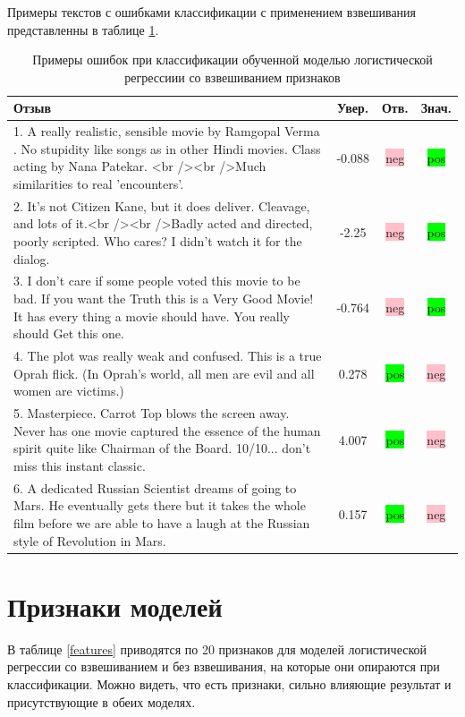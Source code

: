 Примеры текстов с ошибками классификации с применением взвешивания представленны в таблице \ref{logistic:examples}.
\begin{table}
\begin{tabular*}{\textwidth}{p{} @{\extracolsep {\fill}} ccc}
\hline {\bf Отзыв} & {\bf Увер.} & {\bf Отв.} & {\bf Знач.} \\ \hline \hline
{1. A really realistic, sensible movie by Ramgopal Verma . No stupidity like songs as in other Hindi movies. Class acting by Nana Patekar. <br /><br />Much similarities to real 'encounters'.} & -0.088 & \colorbox{pink}{neg} & \colorbox{lime}{pos} \\ \hline
{2. It's not Citizen Kane, but it does deliver. Cleavage, and lots of it.<br /><br />Badly acted and directed, poorly scripted. Who cares? I didn't watch it for the dialog.} & -2.25 & \colorbox{pink}{neg} & \colorbox{lime}{pos} \\ \hline
{3. I don't care if some people voted this movie to be bad. If you want the Truth this is a Very Good Movie! It has every thing a movie should have. You really should Get this one.} & -0.764 & \colorbox{pink}{neg} & \colorbox{lime}{pos} \\ \hline
{4. The plot was really weak and confused. This is a true Oprah flick. (In Oprah's world, all men are evil and all women are victims.)} & 0.278 & \colorbox{lime}{pos} & \colorbox{pink}{neg} \\ \hline
{5. Masterpiece. Carrot Top blows the screen away. Never has one movie captured the essence of the human spirit quite like Chairman of the Board. 10/10... don't miss this instant classic.} & 4.007 & \colorbox{lime}{pos} & \colorbox{pink}{neg} \\ \hline
{6. A dedicated Russian Scientist dreams of going to Mars. He eventually gets there but it takes the whole film before we are able to have a laugh at the Russian style of Revolution in Mars.} & 0.157 & \colorbox{lime}{pos} & \colorbox{pink}{neg} \\ \hline
\end{tabular*}

\caption{Примеры ошибок при классификации обученной моделью логистической регрессиии со взвешиванием признаков}
\label{logistic:examples}
\end{table}
\section{Признаки моделей}
В таблице \ref{features} приводятся по 20 признаков для моделей логистической регрессии со взвешиванием и без взвешивания, на которые они опираются при классификации. Можно видеть, что есть признаки, сильно влияющие результат и присутствующие в обеих моделях.

